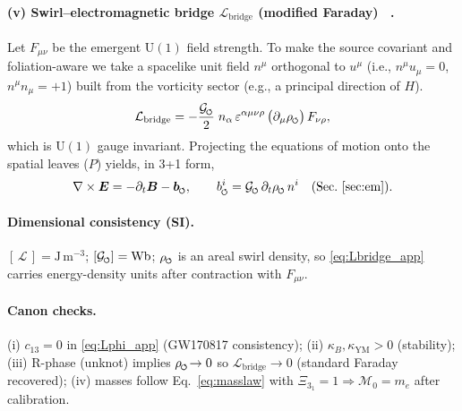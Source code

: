 \documentclass[10pt,reprint,aps,onecolumn,nofootinbib]{revtex4-2}
\newcommand{\vect}[1]{\boldsymbol{#1}} %
\newcommand{\EE}{\vect{E}}
\newcommand{\BB}{\vect{B}}
\begin{document}
    \paragraph*{(v) Swirl–electromagnetic bridge \(\mathcal{L}_{\mathrm{bridge}}\) (modified Faraday)~ \cite{EM_G}.}
        Let \(F_{\mu\nu}\) be the emergent \(\mathrm{U}(1)\) field strength.
        To make the source covariant and foliation-aware we take a spacelike unit field \(n^\mu\) orthogonal to \(u^\mu\) (i.e., \(n^\mu u_\mu=0\), \(n^\mu n_\mu=+1\)) built from the vorticity sector (e.g., a principal direction of \(H\)).
        \begin{equation}
        \mathcal{L}_{\mathrm{bridge}}
        =-\frac{\mathcal{G}_{\mkern-2mu\scriptscriptstyle\boldsymbol{\circlearrowleft}}}{2}\;
        n_\alpha\,\varepsilon^{\alpha\mu\nu\rho}\,
        \big(\partial_\mu \rho_{\mkern-2mu\scriptscriptstyle\boldsymbol{\circlearrowleft}}\big)\,F_{\nu\rho},
        \label{eq:Lbridge_app}
        \end{equation}
        which is \(\mathrm{U}(1)\) gauge invariant.
        Projecting the equations of motion onto the spatial leaves (\(P\)) yields, in 3+1 form,
        \[
            \nabla\times\EE=-\partial_t\BB-\vect{b}_{\mkern-2mu\scriptscriptstyle\boldsymbol{\circlearrowleft}},
            \qquad
            b^i_{\mkern-2mu\scriptscriptstyle\boldsymbol{\circlearrowleft}}
            =\mathcal{G}_{\mkern-2mu\scriptscriptstyle\boldsymbol{\circlearrowleft}}\,
            \partial_t\rho_{\mkern-2mu\scriptscriptstyle\boldsymbol{\circlearrowleft}}\,
            n^i
            \quad\text{(Sec.~\ref{sec:em})}.
        \]

    \paragraph*{Dimensional consistency (SI).}
        \([\,\mathcal{L}\,]=\mathrm{J\,m^{-3}}\);
        \([\mathcal{G}_{\mkern-2mu\scriptscriptstyle\boldsymbol{\circlearrowleft}}]=\mathrm{Wb}\);
        \(\rho_{\mkern-2mu\scriptscriptstyle\boldsymbol{\circlearrowleft}}\) is an areal swirl density, so
        \eqref{eq:Lbridge_app} carries energy-density units after contraction with \(F_{\mu\nu}\).

    \paragraph*{Canon checks.}
    (i) \(c_{13}=0\) in \eqref{eq:Lphi_app} (GW170817 consistency);
        (ii) \(\kappa_B,\kappa_{\mathrm{YM}}>0\) (stability);
        (iii) R-phase (unknot) implies \(\rho_{\mkern-2mu\scriptscriptstyle\boldsymbol{\circlearrowleft}}\!\to 0\) so \(\mathcal{L}_{\mathrm{bridge}}\!\to 0\) (standard Faraday recovered);
        (iv) masses follow Eq.~\ref{eq:masslaw} with \(\Xi_{3_1}=1\Rightarrow \mathcal{M}_0=m_e\) after calibration.
\end{document}
